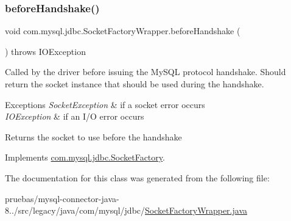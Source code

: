 \mbox{\label{classcom_1_1mysql_1_1jdbc_1_1_socket_factory_wrapper_a6c39038cbdf685cde6e0ce84cecde918}} 
\subsubsection{\texorpdfstring{before\+Handshake()}{beforeHandshake()}}
{\footnotesize\ttfamily void com.\+mysql.\+jdbc.\+Socket\+Factory\+Wrapper.\+before\+Handshake (\begin{DoxyParamCaption}{ }\end{DoxyParamCaption}) throws I\+O\+Exception}

Called by the driver before issuing the My\+S\+QL protocol handshake. Should return the socket instance that should be used during the handshake.


\begin{DoxyExceptions}{Exceptions}
{\em Socket\+Exception} & if a socket error occurs \\
\hline
{\em I\+O\+Exception} & if an I/O error occurs\\
\hline
\end{DoxyExceptions}
\begin{DoxyReturn}{Returns}
the socket to use before the handshake 
\end{DoxyReturn}


Implements \mbox{\hyperlink{interfacecom_1_1mysql_1_1jdbc_1_1_socket_factory_aa9a78553a76681f49c734aaa3f8f126b}{com.\+mysql.\+jdbc.\+Socket\+Factory}}.



The documentation for this class was generated from the following file\+:\begin{DoxyCompactItemize}
\item 
pruebas/mysql-\/connector-\/java-\/8../src/legacy/java/com/mysql/jdbc/\mbox{\hyperlink{_socket_factory_wrapper_8java}{Socket\+Factory\+Wrapper.\+java}}\end{DoxyCompactItemize}
